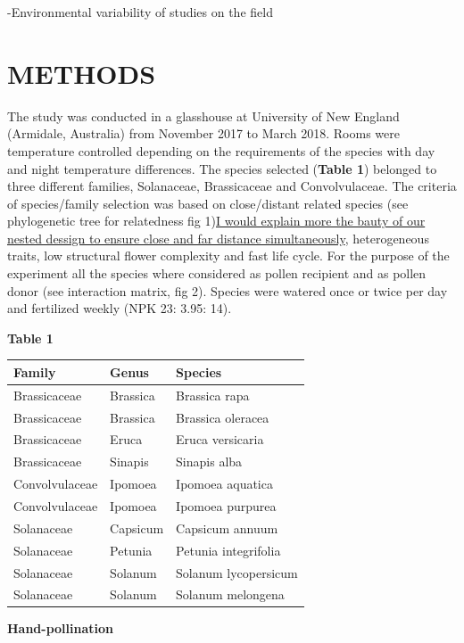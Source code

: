 \documentclass[11pt,a4paper]{article}
\begin{document}
-Environmental variability of studies on the field

\section{METHODS}\label{methods}

The study was conducted in a glasshouse at University of New England
(Armidale, Australia) from November 2017 to March 2018. Rooms were
temperature controlled depending on the requirements of the species with
day and night temperature differences. The species selected
(\textbf{Table 1}) belonged to three different families, Solanaceae,
Brassicaceae and Convolvulaceae. The criteria of species/family
selection was based on close/distant related species (see phylogenetic
tree for relatedness fig 1)\href{}{I would explain more the bauty of our
nested dessign to ensure close and far distance simultaneously},
heterogeneous traits, low structural flower complexity and fast life
cycle. For the purpose of the experiment all the species where
considered as pollen recipient and as pollen donor (see interaction
matrix, fig 2). Species were watered once or twice per day and
fertilized weekly (NPK 23: 3.95: 14).

\textbf{Table 1}

\begin{longtable}[]{@{}lll@{}}
\toprule
Family & Genus & Species\tabularnewline
\midrule
\endhead
Brassicaceae & Brassica & Brassica rapa\tabularnewline
Brassicaceae & Brassica & Brassica oleracea\tabularnewline
Brassicaceae & Eruca & Eruca versicaria\tabularnewline
Brassicaceae & Sinapis & Sinapis alba\tabularnewline
Convolvulaceae & Ipomoea & Ipomoea aquatica\tabularnewline
Convolvulaceae & Ipomoea & Ipomoea purpurea\tabularnewline
Solanaceae & Capsicum & Capsicum annuum\tabularnewline
Solanaceae & Petunia & Petunia integrifolia\tabularnewline
Solanaceae & Solanum & Solanum lycopersicum\tabularnewline
Solanaceae & Solanum & Solanum melongena\tabularnewline
\bottomrule
\end{longtable}

\textbf{Hand-pollination}
\end{document}
